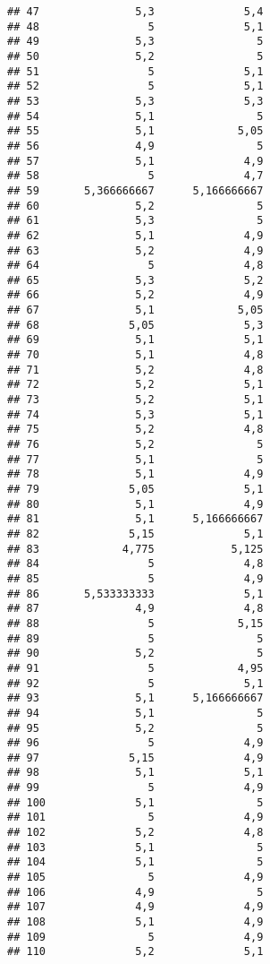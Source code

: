 \documentclass[
]{article}
\begin{document}
\begin{verbatim}
## 47               5,3              5,4
## 48                 5              5,1
## 49               5,3                5
## 50               5,2                5
## 51                 5              5,1
## 52                 5              5,1
## 53               5,3              5,3
## 54               5,1                5
## 55               5,1             5,05
## 56               4,9                5
## 57               5,1              4,9
## 58                 5              4,7
## 59       5,366666667      5,166666667
## 60               5,2                5
## 61               5,3                5
## 62               5,1              4,9
## 63               5,2              4,9
## 64                 5              4,8
## 65               5,3              5,2
## 66               5,2              4,9
## 67               5,1             5,05
## 68              5,05              5,3
## 69               5,1              5,1
## 70               5,1              4,8
## 71               5,2              4,8
## 72               5,2              5,1
## 73               5,2              5,1
## 74               5,3              5,1
## 75               5,2              4,8
## 76               5,2                5
## 77               5,1                5
## 78               5,1              4,9
## 79              5,05              5,1
## 80               5,1              4,9
## 81               5,1      5,166666667
## 82              5,15              5,1
## 83             4,775            5,125
## 84                 5              4,8
## 85                 5              4,9
## 86       5,533333333              5,1
## 87               4,9              4,8
## 88                 5             5,15
## 89                 5                5
## 90               5,2                5
## 91                 5             4,95
## 92                 5              5,1
## 93               5,1      5,166666667
## 94               5,1                5
## 95               5,2                5
## 96                 5              4,9
## 97              5,15              4,9
## 98               5,1              5,1
## 99                 5              4,9
## 100              5,1                5
## 101                5              4,9
## 102              5,2              4,8
## 103              5,1                5
## 104              5,1                5
## 105                5              4,9
## 106              4,9                5
## 107              4,9              4,9
## 108              5,1              4,9
## 109                5              4,9
## 110              5,2              5,1

\end{verbatim}
\end{document}
